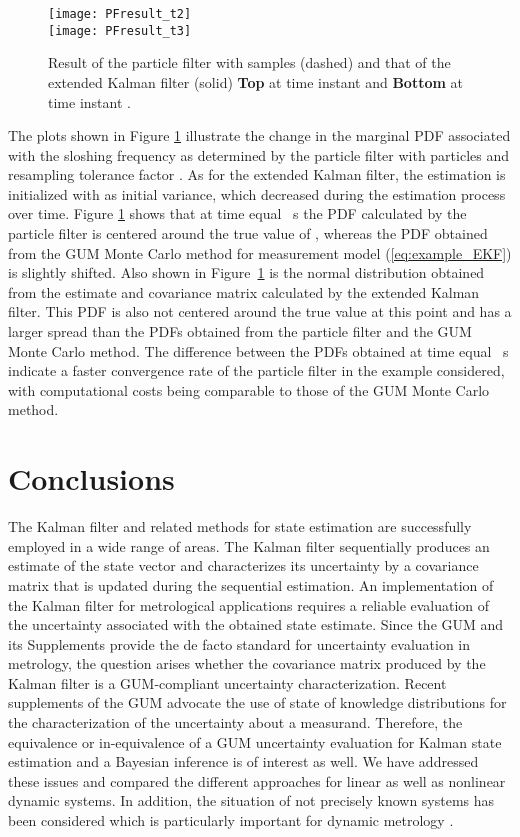 \documentclass[10pt]{article}
\begin{document}
\begin{spacing}{1}
\begin{figure}[h!]
	\centering
	\texttt{[image: PFresult\_t2]}\\
	\texttt{[image: PFresult\_t3]}
	\label{fig:PFresults}
	\caption{Result of the particle filter with  samples (dashed) and that of the extended Kalman filter (solid) \textbf{Top} at time instant  and \textbf{Bottom} at time instant .}
	\label{fig:PFresults}
\end{figure}


The plots shown in Figure \ref{fig:PFresults} illustrate the change in the marginal PDF associated with the sloshing frequency  as determined by the particle filter with  particles and resampling tolerance factor . As for the extended Kalman filter, the estimation is initialized with  as initial variance, which decreased during the estimation process over time. 
Figure \ref{fig:PFresults} shows that at time equal ~s the PDF calculated by the particle filter is centered around the true value of , whereas the PDF obtained from the GUM Monte Carlo method for measurement model (\ref{eq:example_EKF}) is slightly shifted. Also shown in Figure~\ref{fig:PFresults} is the normal distribution obtained from the estimate and covariance matrix calculated by the extended Kalman filter. This PDF is also not centered around the true value at this point and has a larger spread than the PDFs obtained from the particle filter and the GUM Monte Carlo method.
The difference between the PDFs obtained at time equal ~s indicate a faster convergence rate of the particle filter in the example considered, with computational costs being comparable to those of the GUM Monte Carlo method. 

\section{Conclusions}
\label{sec:conclusions}
The Kalman filter and related methods for state estimation are successfully employed in a wide range of areas. The Kalman filter sequentially produces an estimate of the state vector and characterizes its uncertainty by a covariance matrix that is updated during the sequential estimation.
An implementation of the Kalman filter for metrological applications requires a reliable evaluation of the uncertainty associated with the obtained state estimate. Since the GUM \cite{GUM} and its Supplements provide the de facto standard for uncertainty evaluation in metrology, the question arises whether the covariance matrix produced by the Kalman filter is a GUM-compliant uncertainty characterization. 
Recent supplements of the GUM \cite{GUMS1, GUMS2} advocate the use of state of knowledge distributions for the characterization of the uncertainty about a measurand. Therefore, the equivalence or in-equivalence of a GUM uncertainty evaluation for Kalman state estimation and a Bayesian inference is of interest as well. We have addressed these issues and compared the different approaches for linear as well as nonlinear dynamic systems. In addition, the situation of not precisely known systems has been considered which is particularly important for dynamic metrology \cite{Eichstadt2012Diss}.\\



\end{spacing}
\end{document}
